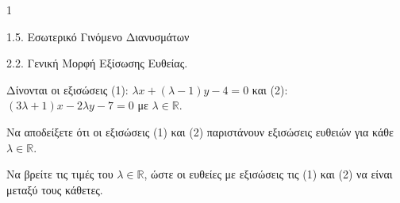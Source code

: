 \begin{ylh}{1}
    \item 1.5. Εσωτερικό Γινόμενο Διανυσμάτων
    \item 2.2. Γενική Μορφή Εξίσωσης Ευθείας.
\end{ylh}
Δίνονται οι εξισώσεις (1): $\lambda x+(\lambda-1)y-4=0$ και (2): $(3\lambda+1)x-2\lambda y-7=0$ με $\lambda \in \mathbb{R}$.
\begin{alist}
\item Να αποδείξετε ότι οι εξισώσεις (1) και (2) παριστάνουν εξισώσεις ευθειών για κάθε $\lambda \in \mathbb{R}$. 
\item Να βρείτε τις τιμές του $\lambda \in \mathbb{R}$, ώστε οι ευθείες με εξισώσεις τις (1) και (2) να είναι μεταξύ τους κάθετες. 
\end{alist}